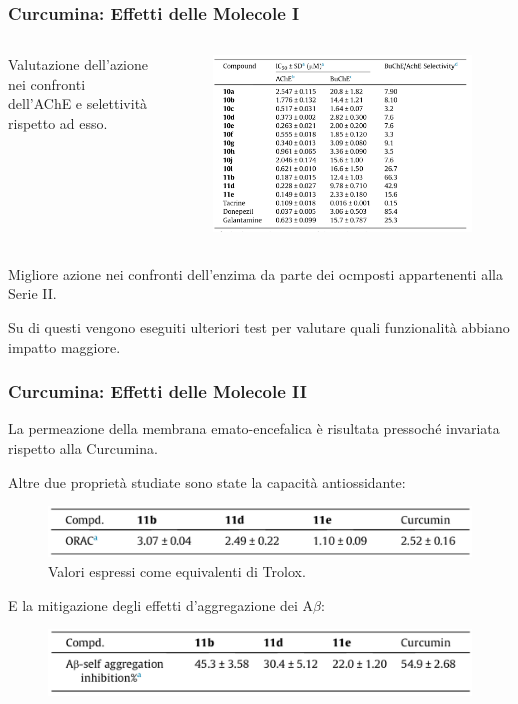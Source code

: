 \documentclass[9pt]{beamer}
\begin{document}
\begin{frame}
	\frametitle{Curcumina: Effetti delle Molecole I}
	\begin{columns}
		\begin{column}{.4\textwidth}
			Valutazione dell'azione nei confronti dell'AChE e selettività rispetto ad esso.
		\end{column}
		\begin{column}{.6\textwidth}
			\begin{figure}
				\includegraphics[width=\textwidth]{immagini/tabellacomposti_curcdone.png}
			\end{figure}
		\end{column}
	\end{columns}
	\bigskip
	Migliore azione nei confronti dell'enzima da parte dei ocmposti appartenenti alla Serie II.
	
	Su di questi vengono eseguiti ulteriori test per valutare quali funzionalità abbiano impatto maggiore.
\end{frame}

\begin{frame}
	\frametitle{Curcumina: Effetti delle Molecole II}
	La permeazione della membrana emato-encefalica è risultata pressoché invariata rispetto alla Curcumina.
	
	Altre due proprietà studiate sono state la capacità antiossidante:
	\begin{figure}
		\includegraphics{immagini/roi_curcdone.png}
		{\caption*{\footnotesize{Valori espressi come equivalenti di Trolox.}}}
	\end{figure}
	
	E la mitigazione degli effetti d'aggregazione dei A$\beta$:
	\begin{figure}
		\includegraphics{immagini/selfab_curcdone.png}
	\end{figure}
\end{frame}
\end{document}
